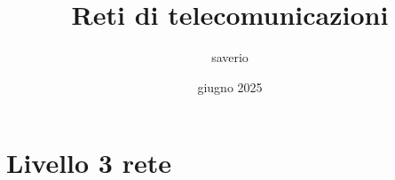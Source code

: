 \documentclass{report}
\title{Reti di telecomunicazioni}
\author{saverio}
\date{giugno 2025}
\begin{document}
\maketitle
\tableofcontents


%


%

%

\chapter{Livello 3 rete}


%

\end{document}
